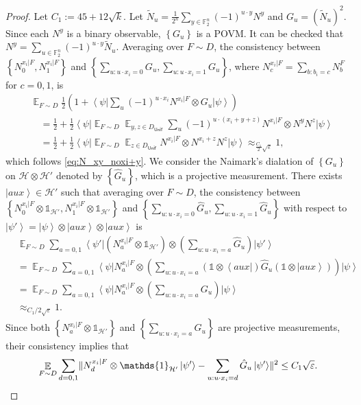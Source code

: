 \documentclass[10pt,a4paper]{article}
\theoremstyle{plain}
\theoremstyle{definition}
\newcommand {\set} [1] {\ensuremath{ \left\lbrace #1 \right\rbrace }}
\DeclarePairedDelimiter{\norm}{\lVert}{\rVert}
\newcommand {\bra} [1] {\ensuremath{ \left\langle #1 \right| }}
\newcommand {\ket} [1] {\ensuremath{ \left| #1 \right\rangle }}
\DeclareMathOperator*{\bigE}{\mathbb{E}}
\newcommand {\id} {\ensuremath{\mathds{1}}}
\newcommand{\ep} {\ensuremath{\varepsilon}}
\newcommand{\x}{\otimes}
\newcommand{\calH}{\mathcal{H}}
\newcommand{\appd}[1]{\approx_{#1}}
\newcommand{\1}{\mathbb{1}} %
\newcommand{\bF}{\mathbb{F}}
\newcommand{\tN}{\tilde{N}}
\newcommand{\Unif}{\mathsf{Unif}}
\begin{document}
\begin{proof}
Let $C_1 := 45 + 12\sqrt{k}$.
 Let $\tN_u = \frac{1}{2^{n}}\sum_{y \in \bF_2^{n}} (-1)^{u\cdot y} N^{y}$ and $G_u = (\tN_u)^2$. Since each $N^{y}$ is a binary observable, $\set{G_u}$ is a POVM.
	 It can be checked that $N^{y} = \sum_{u\in \bF_2^n} (-1)^{u \cdot y} \tN_u$.
	 Averaging over $F \sim D$, the consistency between $\set{ N^{x_i | F}_0, N^{x_i | F}_1}$ and $\set{ \sum_{u:u\cdot x_i = 0} G_u, \sum_{u:u\cdot x_i = 1} G_u}$,
     where $N^{x_i | F}_c = \sum_{b: b_i = c} N^F_b$ for $c = 0,1$,
	 is 
	 \begin{align*}
	 	&\bigE_{F \sim D} \frac{1}{2}(1 + \bra{\psi} \sum_u (-1)^{u \cdot x_i}N^{x_i | F} \x G_u \ket{\psi}) \\
		&\quad =\frac{1}{2} + \frac{1}{2} \bra{\psi} \bigE_{F \sim D} \bigE_{y,z \in D_{\Unif}} \sum_u (-1)^{u \cdot (x_i+y+z)} N^{x_i | F} \x N^{y} N^{z} \ket{\psi} \\
		&\quad =  \frac{1}{2} + \frac{1}{2} \bra{\psi} \bigE_{F \sim D} \bigE_{z\in D_{\Unif}}N^{x_i | F }\x N^{x_i + z} N^{z}  \ket{\psi} 
		\approx_{\frac{C_1}{2} \sqrt{\ep}} 1,
	 \end{align*}
	 which follows \cref{eq:N_xy_noxi+y}.
We consider the Naimark's dialation of $\set{ G_u }$ on $\calH \x \calH'$ denoted by $\set{ \hat{G}_u }$, which is a projective measurement.
There exists $\ket{aux} \in \calH'$ such that 
averaging over $F \sim D$, the consistency between $\set{ N^{x_i | F}_0 \x \id_{\calH'}, N^{x_i | F}_1\x \id_{\calH'}}$ and $\set{ \sum_{u:u\cdot x_i = 0} \hat{G}_u, \sum_{u:u\cdot x_i = 1} \hat{G}_u}$ with respect to $\ket{\psi'} = \ket{\psi} \x \ket{aux} \x \ket{aux}$ is 
\begin{align*}
	&\bigE_{F \sim D} \sum_{a =0,1} \bra{\psi'} (N^{x_i | F}_a \x \id_{\calH'}) \x  (\sum_{u: u\cdot x_i = a} \hat{G}_u) \ket{\psi'} \\
	&=  \bigE_{F \sim D} \sum_{a =0,1} \bra{\psi} N^{x_i | F}_a \x \left(\sum_{u: u\cdot x_i = a} (\id \x \bra{aux}) \hat{G}_u (\id \x \ket{aux} ) \right) \ket{\psi} \\
	&=   \bigE_{F \sim D} \sum_{a =0,1} \bra{\psi} N^{x_i | F}_a \x\left(\sum_{u: u\cdot x_i = a} G_u \right) \ket{\psi} \\
	&\appd{C_1/2\sqrt{\ep}} 1.
\end{align*}
Since both $\set{ N^{x_i | F}_a \x \id_{\calH'} }$ and $\set{ \sum_{u: u\cdot x_i = a} \hat{G}_u }$ are projective measurements, their consistency implies that 
\begin{align*}
	\bigE_{F \sim D} \sum_{d = 0, 1} \norm{ N^{x_i | F}_d \x \id_{\calH'} \ket{\psi'} - \sum_{u: u \cdot x_i = d} \hat{G}_u \ket{\psi'}}^2 \leq C_1 \sqrt{\ep}.
\end{align*}


\end{proof}
\end{document}
